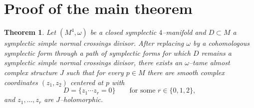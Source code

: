 \documentclass[11pt]{article}
\newtheorem{theorem}{Theorem}
\theoremstyle{remark}
\begin{document}
\section{Proof of the main theorem}

\begin{theorem}\label{thm:main}
Let $(M^4,\omega)$ be a closed symplectic $4$--manifold and
$D\subset M$ a symplectic simple normal crossings divisor.
After replacing $\omega$ by a cohomologous symplectic form through a path of
symplectic forms for which $D$ remains a symplectic simple normal crossings divisor,
there exists an $\omega$--tame almost complex structure $J$ such that for every
$p\in M$ there are smooth complex coordinates $(z_1,z_2)$ centered at $p$
with
\[
D=\{z_1\cdots z_r=0\}
\qquad\text{for some }r\in\{0,1,2\},
\]
and $z_1,\dots,z_r$ are $J$--holomorphic.
\end{theorem}
\end{document}
